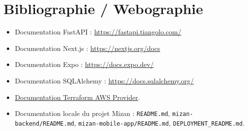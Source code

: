 \documentclass{rapportENSET}
\begin{document}
\section*{Bibliographie / Webographie}
\begin{itemize}
    \item Documentation FastAPI : \url{https://fastapi.tiangolo.com/}
    \item Documentation Next.js : \url{https://nextjs.org/docs}
    \item Documentation Expo : \url{https://docs.expo.dev/}
    \item Documentation SQLAlchemy : \url{https://docs.sqlalchemy.org/}
    \item \href{https://registry.terraform.io/providers/hashicorp/aws/latest/docs}{Documentation Terraform AWS Provider}.
    \item Documentation locale du projet Mizan : \texttt{README.md}, \texttt{mizan-backend/README.md}, \texttt{mizan-mobile-app/README.md}, \texttt{DEPLOYMENT\_README.md}.
\end{itemize}
\end{document}
